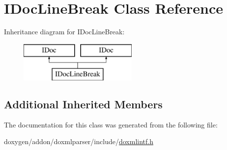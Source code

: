 \hypertarget{class_i_doc_line_break}{}\section{I\+Doc\+Line\+Break Class Reference}
\label{class_i_doc_line_break}
Inheritance diagram for I\+Doc\+Line\+Break\+:\begin{figure}[H]
\begin{center}
\leavevmode
\includegraphics[height=2.000000cm]{class_i_doc_line_break}
\end{center}
\end{figure}
\subsection*{Additional Inherited Members}


The documentation for this class was generated from the following file\+:\begin{DoxyCompactItemize}
\item 
doxygen/addon/doxmlparser/include/\mbox{\hyperlink{include_2doxmlintf_8h}{doxmlintf.\+h}}\end{DoxyCompactItemize}
